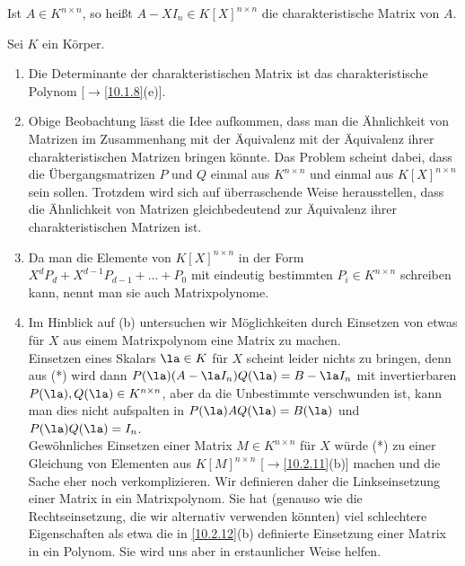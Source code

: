 \documentclass[../../main.tex]{subfiles}
\begin{document}
\begin{df}\label{17.4.3}
    Ist $A\in K^{n\times n}$, so heißt $A-XI_n\in K[X]^{n\times n}$ die charakteristische Matrix von $A$.
\end{df}

\begin{bem}\label{17.4.4}
    Sei $K$ ein Körper.
    \begin{enumerate}[\normalfont(a)]
        \item Die Determinante der charakteristischen Matrix ist das charakteristische Polynom [$\to$\ref{10.1.8}(e)].
        \item Obige Beobachtung lässt die Idee aufkommen, dass man die Ähnlichkeit von Matrizen im Zusammenhang mit der Äquivalenz mit der Äquivalenz ihrer charakteristischen Matrizen bringen könnte. Das Problem scheint dabei, dass die Übergangsmatrizen $P$ und $Q$ einmal aus $K^{n\times n}$ und einmal aus $K[X]^{n\times n}$ sein sollen. Trotzdem wird sich auf überraschende Weise herausstellen, dass die Ähnlichkeit von Matrizen gleichbedeutend zur Äquivalenz ihrer charakteristischen Matrizen ist.
        \item Da man die Elemente von $K[X]^{n\times n}$ in der Form $X^dP_d+X^{d-1}P_{d-1}+\ldots +P_0$ mit eindeutig bestimmten $P_i\in K^{n\times n}$ schreiben kann, nennt man sie auch Matrixpolynome.
        \item Im Hinblick auf (b) untersuchen wir Möglichkeiten durch Einsetzen von etwas für $X$ aus einem Matrixpolynom eine Matrix zu machen. 
        \\Einsetzen eines Skalars $\la\in K$ für $X$ scheint leider nichts zu bringen, denn aus (*) wird dann $P(\la)(A-\la I_n)Q(\la)=B-\la I_n$ mit invertierbaren $P(\la),Q(\la)\in K^{n\times n}$, aber da die Unbestimmte verschwunden ist, kann man dies nicht aufspalten in $P(\la)AQ(\la)=B(\la)$ und $P(\la)Q(\la)=I_n$. 
        \\Gewöhnliches Einsetzen einer Matrix $M\in K^{n\times n}$ für $X$ würde (*) zu einer Gleichung von Elementen aus $K[M]^{n\times n}$ [$\to$\ref{10.2.11}(b)] machen und die Sache eher noch verkomplizieren. Wir definieren daher die Linkseinsetzung einer Matrix in ein Matrixpolynom. Sie hat (genauso wie die Rechtseinsetzung, die wir alternativ verwenden könnten) viel schlechtere Eigenschaften als etwa die in \ref{10.2.12}(b) definierte Einsetzung einer Matrix in ein Polynom. Sie wird uns aber in erstaunlicher Weise helfen.
    \end{enumerate}
\end{bem}
\end{document}
